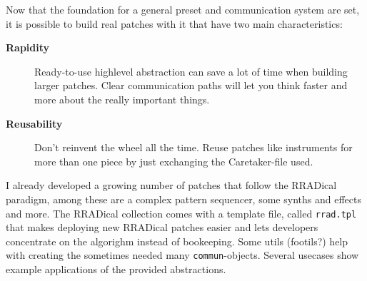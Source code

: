 \documentclass[10pt,english]{scrartcl}
\begin{document}
Now that the foundation for a general preset and communication system are
set, it is possible to build real patches with it that have two main
characteristics:
\begin{description}
\item[\textbf{Rapidity}]

Ready-to-use highlevel abstraction can save a lot of time when building
larger patches. Clear communication paths will let you think faster and
more about the really important things.

\item[\textbf{Reusability}]

Don't reinvent the wheel all the time. Reuse patches like instruments
for more than one piece by just exchanging the Caretaker-file used.

\end{description}

I already developed a growing number of patches that follow the RRADical
paradigm, among these are a complex pattern sequencer, some synths and
effects and more. The RRADical collection comes with a template file,
called \texttt{rrad.tpl} that makes deploying new RRADical patches easier and
lets developers concentrate on the algorighm instead of bookeeping. Some
utils (footils?) help with creating the sometimes needed many
\texttt{commun}-objects. Several usecases show example applications of the
provided abstractions.
\end{document}
